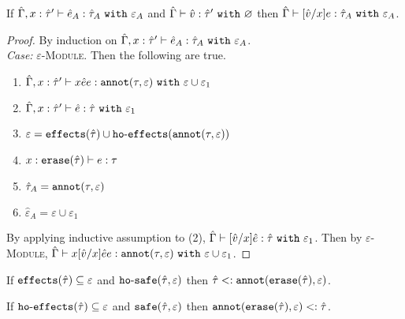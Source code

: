 \begin{appendix}
\hrulefill

\begin{lemma}[Substitution]
If $\hat \Gamma, x: \hat \tau' \vdash \hat e_A: \hat \tau_A~\mathtt{with}~ \varepsilon_A$ and $\hat \Gamma \vdash \hat v: \hat \tau'~\mathtt{with}~ \varnothing$ then $\hat \Gamma \vdash [\hat v/x]e: \hat \tau_A~\mathtt{with}~ \varepsilon_A$.
\end{lemma}

\begin{proof} By induction on $\hat \Gamma, x: \hat \tau' \vdash \hat e_A: \hat \tau_A~\mathtt{with}~ \varepsilon_A$. \\

\textit{Case:} \textsc{$\varepsilon$-Module}. Then the following are true.

\begin{enumerate}
	\setlength\itemsep{-0.7em}
	\item $\hat \Gamma, x: \hat \tau' \vdash {x}{\hat e}{e} : \mathtt{annot}(\tau, \varepsilon)~\mathtt{with}~ \varepsilon \cup \varepsilon_1$
	\item $\hat \Gamma, x: \hat \tau' \vdash \hat e: \hat \tau~\mathtt{with}~ \varepsilon_1$
	\item $\varepsilon = \mathtt{effects}(\hat \tau) \cup \mathtt{ho \hbox{-} effects}(\mathtt{annot}(\tau, \varepsilon))$
	\item $x: \mathtt{erase}(\hat \tau) \vdash e: \tau$
	\item $\hat \tau_A = \mathtt{annot}(\tau, \varepsilon)$
	\item $\hat \varepsilon_A = \varepsilon \cup \varepsilon_1$
\end{enumerate}

By applying inductive assumption to (2), $\hat \Gamma \vdash [\hat v/x]\hat e: \hat \tau~\mathtt{with}~ \varepsilon_1$.
 Then by \textsc{$\varepsilon$-Module}, $\hat \Gamma \vdash {x}{[\hat v/x]\hat e}{e}: \mathtt{annot}(\tau, \varepsilon)~\mathtt{with}~ \varepsilon \cup \varepsilon_1$.
\end{proof}

\hrulefill

\begin{lemma}
If $\mathtt{effects}(\hat \tau) \subseteq \varepsilon$ and $\mathtt{ho \hbox{-} safe}(\hat \tau, \varepsilon)$ then $\hat \tau <: \mathtt{annot}(\mathtt{erase}(\hat \tau), \varepsilon)$.
\end{lemma}

\begin{lemma}
If $\mathtt{ho \hbox{-} effects}(\hat \tau) \subseteq \varepsilon$ and $\mathtt{safe}(\hat \tau, \varepsilon)$ then $\mathtt{annot(erase}(\hat \tau), \varepsilon) <: \hat \tau$.
\end{lemma}


\end{appendix}
